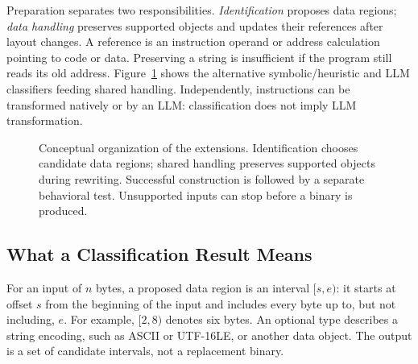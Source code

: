 Preparation separates two responsibilities. \emph{Identification} proposes
data regions; \emph{data handling} preserves supported objects and updates
their references after layout changes. A reference is an instruction
operand or address calculation pointing to code or data. Preserving a
string is insufficient if the program still reads its old address.
Figure~\ref{fig:extended_pipeline} shows the alternative symbolic/heuristic
and LLM classifiers feeding shared handling. Independently, instructions
can be transformed natively or by an LLM: classification does not imply
LLM transformation.
\begin{figure}[t]
\centering
{}
\caption{Conceptual organization of the extensions. Identification chooses
candidate data regions; shared handling preserves supported objects during
rewriting. Successful construction is followed by a separate behavioral
test. Unsupported inputs can stop before a binary is produced.}
\label{fig:extended_pipeline}
\end{figure}

\subsection{What a Classification Result Means}
For an input of $n$ bytes, a proposed data region is an interval $[s,e)$:
it starts at offset $s$ from the beginning of the input and includes every
byte up to, but not including, $e$. For example, $[2,8)$ denotes six bytes.
An optional type describes a string encoding, such as ASCII or UTF-16LE,
or another data object. The output is a set of candidate intervals,
not a replacement binary.

